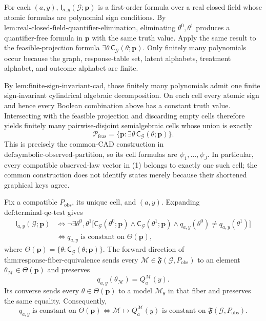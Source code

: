 For each \((a,y)\), \(\mathsf I_{a,y}(\mathcal G;\mathbf p)\) is a first-order formula over a real closed field whose atomic formulas are polynomial sign conditions. By \(\text{lem:real-closed-field-quantifier-elimination}\), eliminating \(\theta^0,\theta^1\) produces a quantifier-free formula in \(\mathbf p\) with the same truth value. Apply the same result to the feasible-projection formula \(\exists\theta\,\mathsf C_{\mathcal G}(\theta;\mathbf p)\). Only finitely many polynomials occur because the graph, response-table set, latent alphabets, treatment alphabet, and outcome alphabet are finite.

By \(\text{lem:finite-sign-invariant-cad}\), those finitely many polynomials admit one finite sign-invariant cylindrical algebraic decomposition. On each cell every atomic sign and hence every Boolean combination above has a constant truth value. Intersecting with the feasible projection and discarding empty cells therefore yields finitely many pairwise-disjoint semialgebraic cells whose union is exactly
\[
\mathcal P_{\mathrm{feas}}
=\{\mathbf p:\exists\theta\,\mathsf C_{\mathcal G}(\theta;\mathbf p)\}.
\tag{1}
\]
This is precisely the common-CAD construction in \(\text{def:symbolic-observed-partition}\), so its cell formulas are \(\psi_1,\ldots,\psi_J\). In particular, every compatible observed-law vector in (1) belongs to exactly one such cell; the common construction does not identify states merely because their shortened graphical keys agree.

Fix a compatible \(P_{\mathrm{obs}}\), its unique cell, and \((a,y)\). Expanding \(\text{def:terminal-qe-test}\) gives
\[
\begin{aligned}
\mathsf I_{a,y}(\mathcal G;\mathbf p)
&\Longleftrightarrow
\neg\exists\theta^0,\theta^1\bigl[
\mathsf C_{\mathcal G}(\theta^0;\mathbf p)
\wedge\mathsf C_{\mathcal G}(\theta^1;\mathbf p)
\wedge q_{a,y}(\theta^0)\neq q_{a,y}(\theta^1)
\bigr]\\
&\Longleftrightarrow
q_{a,y}\text{ is constant on }
\Theta(\mathbf p),
\end{aligned}
\tag{2}
\]
where \(\Theta(\mathbf p)=\{\theta:\mathsf C_{\mathcal G}(\theta;\mathbf p)\}\). The forward direction of \(\text{thm:response-fiber-equivalence}\) sends every \(\mathcal M\in\mathfrak F(\mathcal G,P_{\mathrm{obs}})\) to an element \(\theta_{\mathcal M}\in\Theta(\mathbf p)\) and preserves
\[
q_{a,y}(\theta_{\mathcal M})=Q_a^{\mathcal M}(y).
\tag{3}
\]
Its converse sends every \(\theta\in\Theta(\mathbf p)\) to a model \(\mathcal M_\theta\) in that fiber and preserves the same equality. Consequently,
\[
q_{a,y}\text{ is constant on }\Theta(\mathbf p)
\Longleftrightarrow
\mathcal M\longmapsto Q_a^{\mathcal M}(y)
\text{ is constant on }\mathfrak F(\mathcal G,P_{\mathrm{obs}}).
\tag{4}
\]

